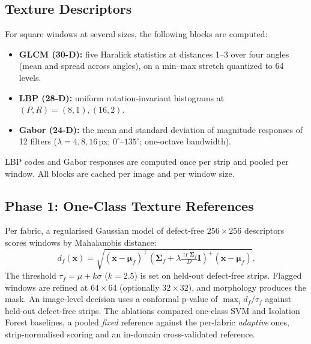 \documentclass[conference]{IEEEtran}
\begin{document}
\subsection{Texture Descriptors}
For square windows at several sizes, the following blocks are computed:
\begin{itemize}
  \item \textbf{GLCM (30-D):} five Haralick statistics at distances 1--3 over four angles (mean and spread across angles), on a min--max stretch quantized to 64 levels.
  \item \textbf{LBP (28-D):} uniform rotation-invariant histograms at $(P,R)=(8,1),(16,2)$.
  \item \textbf{Gabor (24-D):} the mean and standard deviation of magnitude responses of 12 filters ($\lambda=4,8,16$\,px; $0^\circ$--$135^\circ$; one-octave bandwidth).
\end{itemize}
LBP codes and Gabor responses are computed once per strip and pooled per window. All blocks are cached per image and per window size.

\subsection{Phase 1: One-Class Texture References}
Per fabric, a regularised Gaussian model of defect-free $256\times256$ descriptors scores windows by Mahalanobis distance:
\begin{equation}
d_f(\mathbf{x})=\sqrt{(\mathbf{x}-\boldsymbol{\mu}_f)^\top(\boldsymbol{\Sigma}_f+\lambda\tfrac{\operatorname{tr}\boldsymbol{\Sigma}_f}{D}\mathbf{I})^{+}(\mathbf{x}-\boldsymbol{\mu}_f)}.
\end{equation}
The threshold $\tau_f=\mu+k\sigma$ ($k=2.5$) is set on held-out defect-free strips. Flagged windows are refined at $64\times64$ (optionally $32\times32$), and morphology produces the mask. An image-level decision uses a conformal p-value of $\max_i d_f/\tau_f$ against held-out defect-free strips. The ablations compared one-class SVM and Isolation Forest baselines, a pooled \emph{fixed} reference against the per-fabric \emph{adaptive} ones, strip-normalised scoring and an in-domain cross-validated reference.
\end{document}
